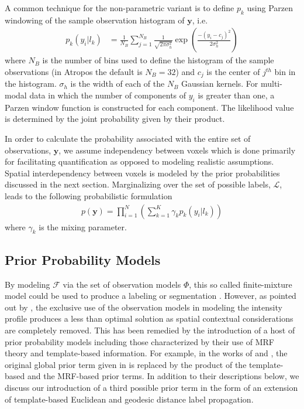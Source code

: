 \documentclass[11pt,english]{article}
\begin{document}
A common technique for the non-parametric variant is to define $p_k$ using Parzen windowing of the sample observation histogram of $\mathbf{y}$, i.e.
\begin{align} \label{eq:nonparam}
  p_k\left(y_i|l_k\right) &= \frac{1}{N_B} \sum_{j=1}^{N_B} \frac{1}{\sqrt{2\pi \sigma_h^2}}\exp\left( \frac{ -(y_i - c_j)^2 }{2\sigma_h^2} \right)
\end{align}
where $N_B$ is the number of bins used to define the histogram of the sample observations (in Atropos the default is $N_B = 32$) and $c_j$ is the center of $j^{th}$ bin in the histogram.  $\sigma_h$ is the width of each of the $N_B$ Gaussian kernels.  For multi-modal data in which the number of components of $y_i$ is greater than one, a Parzen window function is constructed for each component.  The likelihood value is determined by the joint probability given by their product.

In order to calculate the probability associated with the entire set of observations, $\mathbf{y}$, we assume independency between voxels which is done primarily for facilitating quantification as opposed to modeling realistic assumptions.  Spatial interdependency between voxels is modeled by the prior probabilities discussed in the next section.  Marginalizing over the set of possible labels, $\mathcal{L}$, leads to the following probabilistic formulation
\begin{align}\label{eq:likelihood}
  p(\mathbf{y}) = \prod_{i=1}^N \left(      
                                                        \sum_{k=1}^K \gamma_k p_k(y_i|l_k)
                                                        \right)
\end{align}
where $\gamma_k$ is the mixing parameter.  

\subsection{Prior Probability Models}

By modeling $\mathcal{F}$ via the set of observation models $\Phi$, this so called finite-mixture model could be used to produce a labeling or segmentation \citep[e.g.][]{Wells1996}.  However, as pointed out by \cite{Zhang2001}, the exclusive use of the observation models in modeling the intensity profile produces a less than optimal solution as spatial contextual considerations are completely removed.  This has been remedied by the introduction of a host of  prior probability models including those characterized by their use of MRF theory and template-based information.  For example, in the works of \cite{Leemput1999a} and \cite{Weisenfeld2009}, the original global prior term given in \cite{Wells1996} is replaced by the product of the template-based and the MRF-based prior terms.  In addition to their descriptions below, we discuss our introduction of a third possible prior term in the form of an extension of template-based Euclidean and geodesic distance label propagation.  
\end{document}
